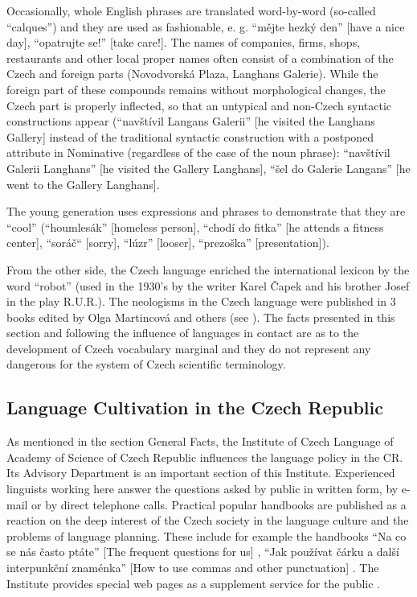 \begin{multicols}{2}
Occasionally, whole English phrases are translated word-by-word (so-called “calques”) and they are used as fashionable, e. g. “mějte hezký den” {[}have a nice day{]}, “opatrujte se!” {[}take care!{]}. The names of companies, firms, shops, restaurants and other local proper names often consist of a combination of the Czech and foreign parts (Novodvorská Plaza, Langhans Galerie). While the foreign part of these compounds remains without morphological changes, the Czech part is properly inflected, so that an untypical and non-Czech syntactic constructions appear (“navštívil Langans Galerii” {[}he visited the Langhans Gallery{]} instead of the traditional syntactic construction with a postponed attribute in Nominative (regardless of the case of the noun phrase): “navštívil Galerii Langhans” {[}he visited the Gallery Langhans{]}, “šel do Galerie Langans” {[}he went to the Gallery Langhans{]}.

The young generation uses expressions and phrases to demonstrate that they are “cool” (“houmlesák” {[}homeless person{]}, “chodí do fitka” {[}he attends a fitness center{]}, “soráč“ {[}sorry{]}, “lúzr” {[}looser{]}, “prezoška” {[}presentation{]}).

From the other side, the Czech language enriched the international lexicon by the word “robot” (used in the 1930’s by the writer Karel Čapek and his brother Josef in the play R.U.R.).
The neologisms in the Czech language were published in 3 books edited by Olga Martincová and others (see \cite{Martincova}).
The facts presented in this section and following the influence of languages in contact are as to the development of Czech vocabulary marginal and they do not represent any dangerous for the system of Czech scientific terminology.

\subsection{Language Cultivation in the Czech Republic}

As mentioned in the section General Facts, the Institute of Czech Language of Academy of Science of Czech Republic influences the language policy in the CR. Its Advisory Department is an important section of this Institute. Experienced linguists working here answer the questions asked by public in written form, by e-mail or by direct telephone calls. Practical popular handbooks are published as a reaction on the deep interest of the Czech society in the language culture and the problems of language planning. These include for example the handbooks “Na co se nás často ptáte” {[}The frequent questions for us{]} \cite{Cerna}, “Jak používat čárku a další interpunkční znaménka” {[}How to use commas and other punctuation{]} \cite{Janovec}. The Institute provides special web pages as a supplement service for the public \cite{Note6}.


\end{multicols}
